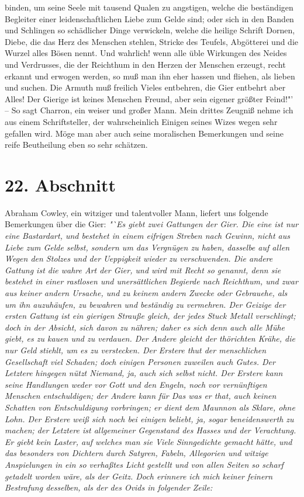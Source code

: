 {binden, um seine Seele mit tausend Qualen zu angstigen, welche die beständigen
Begleiter einer leidenschaftlichen Liebe zum Gelde sind; oder sich in den Banden
und Schlingen so schädlicher Dinge verwickeln, welche die heilige Schrift
Dornen, Diebe, die das Herz des Menschen stehlen, Stricke des Teufels,
Abgötterei und die Wurzel alles Bösen nennt. Und wahrlich! wenn alle üble
Wirkungen des Neides und Verdrusses, die der Reichthum in den Herzen der
Menschen erzeugt, recht erkannt und erwogen werden, so muß man ihn eher hassen
und fliehen, als lieben und suchen. Die Armuth muß freilich Vieles entbehren,
die Gier entbehrt aber Alles! Der Gierige ist keines Menschen Freund, aber sein
eigener größter Feind!"'} -- So sagt Charron, ein weiser und großer Mann. Mein
drittes Zeugniß nehme ich aus einem Schriftsteller, der wahrscheinlich Einigen
seines Wizes wegen sehr gefallen wird. Möge man aber auch seine moralischen
Bemerkungen und seine reife Beutheilung eben so sehr schätzen.

\section{22. Abschnitt} \label{kap13_ab22}

Abraham Cowley, ein witziger und talentvoller Mann, liefert uns folgende
Bemerkungen über die Gier:
\textit{"`Es giebt zwei Gattungen der Gier. Die eine ist
nur eine Bastardart, und bestehet in einem eifrigen Streben nach Gewinn, nicht
aus Liebe zum Gelde selbst, sondern um das Vergnügen zu haben, dasselbe auf
allen Wegen den Stolzes und der Ueppigkeit wieder zu verschwenden. Die andere
Gattung ist die wahre Art der Gier, und wird mit Recht so genannt, denn sie
bestehet in einer rastlosen und unersättlichen Begierde nach Reichthum, und zwar
aus keiner andern Ursache, und zu keinem andern Zwecke oder Gebrauehe, als um
ihn auzuhäufen, zu bewahren und beständig zu vermehren. Der Geizige der ersten
Gattung ist ein gierigen Strauße gleich, der jedes Stuck Metall verschlingt;
doch in der Absicht, sich davon zu nähren; daher es sich denn auch alle Mühe
giebt, es zu kauen und zu verdauen. Der Andere gleicht der thörichten Krähe, die
nur Geld stiehlt, um es zu verstecken.  Der Erstere thut der menschlichen
Gesellschaft viel Schaden; doch einigen Personen zuweilen auch Gutes. Der
Letztere hingegen nützt Niemand, ja, auch sich selbst nicht. Der Erstere kann
seine Handlungen weder vor Gott und den Engeln, noch vor vernünftigen Menschen
entschuldigen; der Andere kann für Das was er that, auch keinen Schatten von
Entschuldigung vorbringen; er dient dem Maunnon als Sklare, ohne Lohn. Der
Erstere weiß sich noch bei einigen beliebt, ja, sogar beneidenswerth zu machen;
der Letztere ist allgemeiner Gegenstand des Hasses und der Verachtung. Er giebt
kein Laster, auf welches man sie Viele Sinngedichte gemacht hätte, und das
besonders von Dichtern durch Satyren, Fabeln, Allegorien und witzige
Anspielungen in ein so verhaßtes Licht gestellt und von allen Seiten so scharf
getadelt worden wäre, als der Geitz. Doch erinnere ich mich keiner feinern
Bestrafung desselben, als der des Ovids in folgender Zeile:}

